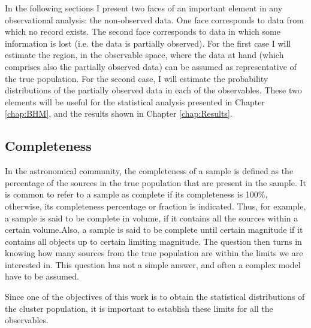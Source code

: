 In the following sections I present two faces of an important element in any observational analysis: the non-observed data. One face corresponds to data from which no record exists. The second face corresponds to data in which some information is lost (i.e. the data is partially observed). For the first case I will estimate the region, in the observable space, where the data at hand (which comprises also the partially observed data) can be assumed as  representative of the true population. For the second case, I will estimate the probability distributions of the partially observed data in each of the observables. These two elements will be useful for the statistical analysis presented in Chapter \ref{chap:BHM}, and the results shown in Chapter \ref{chap:Results}.      

\subsection{Completeness}
\label{sect:ddr2_completeness}

In the astronomical community, the completeness of a sample is defined as the percentage of the sources in the true population that are present in the sample. It is common to refer to a sample as complete if its completeness is 100\%, otherwise, its completeness percentage or fraction is indicated. Thus, for example, a sample is said to be complete in volume, if it contains all the sources within a certain volume.Also, a sample is said to be complete until certain magnitude if it contains all objects up to certain limiting magnitude. The question then turns in knowing how many sources from the true population are within the limits we are interested in. This question has not a simple answer, and often a complex model have to be assumed. 

Since one of the objectives of this work is to obtain the statistical distributions of the cluster population, it is important to establish these limits for all the observables.


